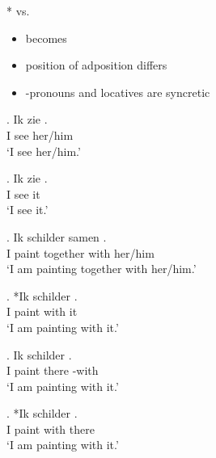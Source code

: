 \documentclass[xcolor=dvipsnames,10pt]{beamer}
\begin{document}
\begin{frame}

* vs. 

\vspace{1em}

\pause

\begin{itemize}
	\item {} becomes  \pause
	\item position of adposition differs \pause
	\item {}-pronouns and locatives are syncretic
\end{itemize}

\end{frame}



\begin{frame}

\exg. Ik zie .\\
 I see her/him\\
 `I see her/him.'\label{ex:aniobj}

\exg. Ik zie .\\
 I see it\\
 `I see it.'\label{ex:inaniobj}

\end{frame}


\begin{frame}

\exg. Ik schilder samen  .\\
 I paint together with her/him\\
 `I am painting together with her/him.'\label{ex:prepani}

\exg. *Ik schilder  .\\
 I paint with it\\
 `I am painting with it.'\label{ex:prephet}

\exg. Ik schilder  .\\
 I paint there -with\\
 `I am painting with it.'\label{ex:preper}

\exg. *Ik schilder  .\\
 I paint with there\\
 `I am painting with it.'\label{ex:erprep}

\end{frame}
\end{document}

